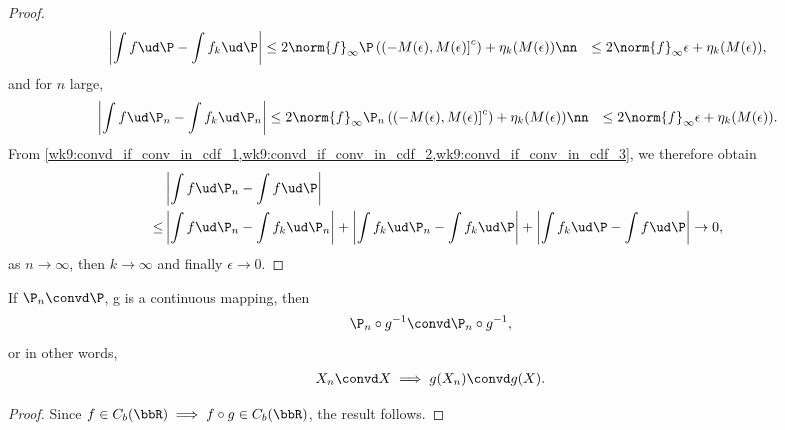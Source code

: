 \documentclass[../aipt.tex]{subfiles}
\begin{document}
\begin{proof}
\begin{align}
\left| \int f \ud\P - \int f_k \ud\P\right|
&\leq 2\norm{f}_{\infty} \P \left({\left(-M(\epsilon), M(\epsilon)\right]^c}\right) + \eta_k(M(\epsilon))\nn
&\leq 2\norm{f}_{\infty} \epsilon + \eta_k(M(\epsilon)), \label{wk9:convd_if_conv_in_cdf_2}
\end{align}
and for $n$ large,
\begin{align}
\left| \int f \ud\P_n - \int f_k \ud\P_n\right|
&\leq 2\norm{f}_{\infty} \P_n \left({\left(-M(\epsilon), M(\epsilon)\right]^c}\right) + \eta_k(M(\epsilon))\nn
&\leq 2 \norm{f}_{\infty} \epsilon + \eta_k(M(\epsilon)). \label{wk9:convd_if_conv_in_cdf_3}
\end{align}
From \cref{wk9:convd_if_conv_in_cdf_1,wk9:convd_if_conv_in_cdf_2,wk9:convd_if_conv_in_cdf_3}, we therefore obtain
\begin{align*}
     & \left| \int f \ud\P_n - \int f \ud\P \right| \\
\leq & \left| \int f \ud\P_n - \int f_k \ud\P_n \right| +
\left| \int f_k \ud\P_n - \int f_k \ud\P \right| +
\left| \int f_k \ud\P - \int f \ud\P \right| \to 0,
\end{align*}
as $n\to\infty$, then $k\to\infty$ and finally $\epsilon\to0$.
\end{proof}
%
\begin{Lemma}
If $\P_n \convd \P$, g is a continuous mapping, then
\begin{align*}
& \P_n \circ g^{-1} \convd \P_n \circ g^{-1}, 
\end{align*}
or in other words,
\begin{align*}
& X_n \convd X \implies g(X_n) \convd g(X).
\end{align*}
\end{Lemma}
\begin{proof}
Since $f \in C_b(\bbR) \implies f \circ g \in C_b(\bbR)$, the result follows.
\end{proof}
\end{document}
